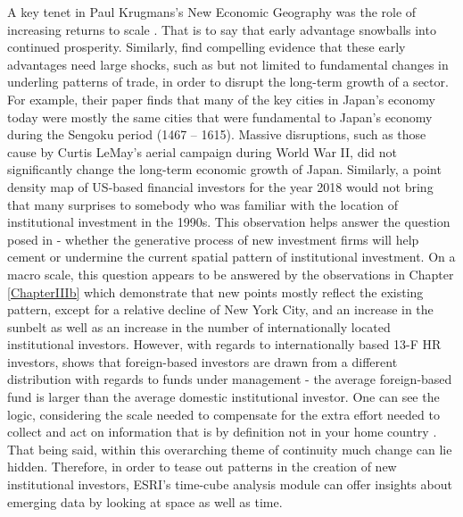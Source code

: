 A key tenet in Paul Krugmans's New Economic Geography was the role of increasing returns to scale \citep{krugman1991increasing}.  That is to say that early advantage snowballs into continued prosperity.  Similarly, \cite{davis2002bones} find compelling evidence that these early advantages need large shocks, such as but not limited to fundamental changes in underling patterns of trade, in order to disrupt the long-term growth of a sector.  For example, their paper finds that many of the key cities in Japan's economy today were mostly the same cities that were fundamental to Japan's economy during the Sengoku period (1467 -- 1615).  Massive disruptions, such as those cause by Curtis LeMay's aerial campaign during World War II, did not significantly change the long-term economic growth of Japan.  Similarly, a point density map of US-based financial investors for the year 2018 would not bring that many surprises to somebody who was familiar with the location of institutional investment in the 1990s.  This observation helps answer the question posed in \cite{GreenOLef2014} - whether the generative process of new investment firms will help cement or undermine the current spatial pattern of institutional investment.  On a macro scale, this question appears to be answered by the observations in Chapter \ref{ChapterIIIb} which demonstrate that new points mostly reflect the existing pattern, except for a relative decline of New York City, and an increase in the sunbelt as well as an increase in the number of internationally located institutional investors.  However, with regards to internationally based 13-F HR investors, \cite{Lefebvre2014} shows that foreign-based investors are drawn from a different distribution with regards to funds under management - the average foreign-based fund is larger than the average domestic institutional investor. One can see the logic,  considering the scale needed to compensate for the extra effort needed to collect and act on information that is by definition not in your home country \citep{malloythe2005}. That being said, within this overarching theme of continuity much change can lie hidden.  Therefore, in order to tease out patterns in the creation of new institutional investors, ESRI's time-cube analysis module can offer insights about emerging data by looking at space as well as time. 

